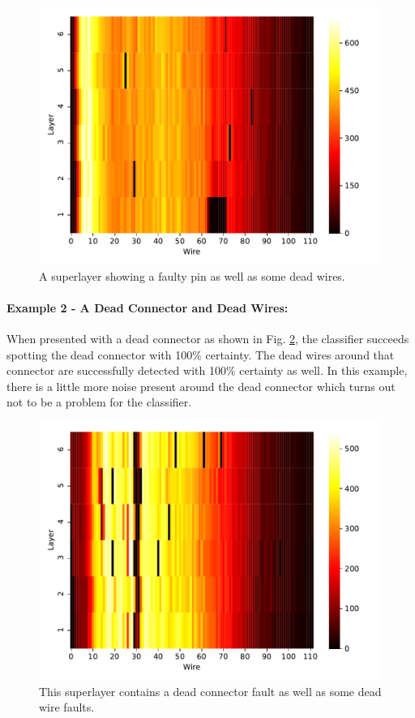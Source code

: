 \begin{figure}
  \includegraphics[width=\textwidth]{../figures/small_pin_success}
  \caption{A superlayer showing a faulty pin as well as some dead
    wires.}
  \label{fig:pin-success}
\end{figure}

\paragraph{Example 2 - A Dead Connector and Dead Wires:}

When presented with a dead connector as shown in
Fig. \ref{fig:connector-success}, the classifier succeeds spotting the
dead connector with 100\% certainty. The dead wires around that
connector are successfully detected with 100\% certainty as well. In
this example, there is a little more noise present around the dead
connector which turns out not to be a problem for the classifier.

\begin{figure}
  \includegraphics[width=\textwidth]{../figures/dead_connector_success}
  \caption{This superlayer contains a dead connector fault as well as
    some dead wire faults.}
  \label{fig:connector-success}
\end{figure}

